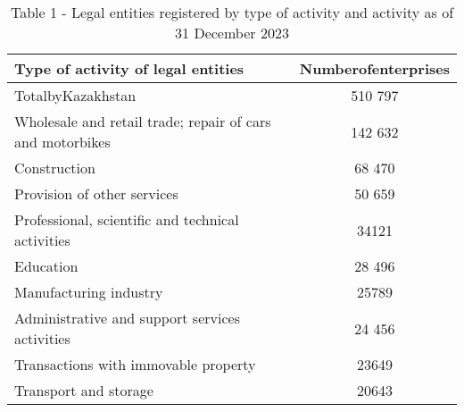 \begin{table}[H]
\caption*{Table 1 - Legal entities registered by type of activity and activity as of 31 December 2023}
\centering
\begin{tabular}{|lc|}
\hline
\multicolumn{1}{|p{0.7\textwidth}|}{Type of activity of legal entities}                                                       & \multicolumn{1}{l|}{Numberofenterprises} \\ \hline
\multicolumn{1}{|p{0.7\textwidth}|}{TotalbyKazakhstan}                                                                        & 510 797                                  \\ \hline
\multicolumn{1}{|p{0.7\textwidth}|}{Wholesale and retail trade; repair of cars and motorbikes}                                & 142 632                                  \\ \hline
\multicolumn{1}{|p{0.7\textwidth}|}{Construction}                                                                             & 68 470                                   \\ \hline
\multicolumn{1}{|p{0.7\textwidth}|}{Provision of other services}                                                              & 50 659                                   \\ \hline
\multicolumn{1}{|p{0.7\textwidth}|}{Professional, scientific and technical activities}                                        & 34121                                    \\ \hline
\multicolumn{1}{|p{0.7\textwidth}|}{Education}                                                                                & 28 496                                   \\ \hline
\multicolumn{1}{|p{0.7\textwidth}|}{Manufacturing industry}                                                                   & 25789                                    \\ \hline
\multicolumn{1}{|p{0.7\textwidth}|}{Administrative and support services activities}                                           & 24 456                                   \\ \hline
\multicolumn{1}{|p{0.7\textwidth}|}{Transactions with immovable property}                                                     & 23649                                    \\ \hline
\multicolumn{1}{|p{0.7\textwidth}|}{Transport and storage}                                                                    & 20643                                    \\ \hline

\end{tabular}
\end{table}
